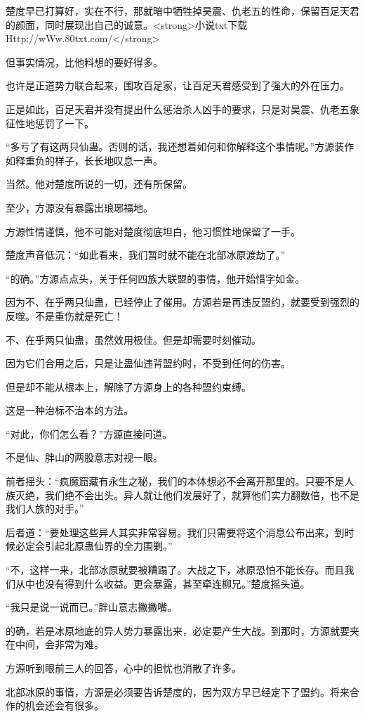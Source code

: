 \begin{this_body}
楚度早已打算好，实在不行，那就暗中牺牲掉昊震、仇老五的性命，保留百足天君的颜面，同时展现出自己的诚意。<strong>小说txt下载Http://wWw.80txt.com/</strong>

但事实情况，比他料想的要好得多。

也许是正道势力联合起来，围攻百足家，让百足天君感受到了强大的外在压力。

正是如此，百足天君并没有提出什么惩治杀人凶手的要求，只是对昊震、仇老五象征性地惩罚了一下。

“多亏了有这两只仙蛊。否则的话，我还想着如何和你解释这个事情呢。”方源装作如释重负的样子，长长地叹息一声。

当然。他对楚度所说的一切，还有所保留。

至少，方源没有暴露出琅琊福地。

方源性情谨慎，他不可能对楚度彻底坦白，他习惯性地保留了一手。

楚度声音低沉：“如此看来，我们暂时就不能在北部冰原渡劫了。”

“的确。”方源点点头，关于任何四族大联盟的事情，他开始惜字如金。

因为不、在乎两只仙蛊，已经停止了催用。方源若是再违反盟约，就要受到强烈的反噬。不是重伤就是死亡！

不、在乎两只仙蛊，虽然效用极佳。但是却需要时刻催动。

因为它们合用之后，只是让蛊仙违背盟约时，不受到任何的伤害。

但是却不能从根本上，解除了方源身上的各种盟约束缚。

这是一种治标不治本的方法。

“对此，你们怎么看？”方源直接问道。

不是仙、胖山的两股意志对视一眼。

前者摇头：“疯魔窟藏有永生之秘，我们的本体想必不会离开那里的。只要不是人族灭绝，我们绝不会出头。异人就让他们发展好了，就算他们实力翻数倍，也不是我们人族的对手。”

后者道：“要处理这些异人其实非常容易。我们只需要将这个消息公布出来，到时候必定会引起北原蛊仙界的全力围剿。”

“不，这样一来，北部冰原就要被糟蹋了。大战之下，冰原恐怕不能长存。而且我们从中也没有得到什么收益。更会暴露，甚至牵连柳兄。”楚度摇头道。

“我只是说一说而已。”胖山意志撇撇嘴。

的确，若是冰原地底的异人势力暴露出来，必定要产生大战。到那时，方源就要夹在中间，会非常为难。

方源听到眼前三人的回答，心中的担忧也消散了许多。

北部冰原的事情，方源是必须要告诉楚度的，因为双方早已经定下了盟约。将来合作的机会还会有很多。


\end{this_body}
